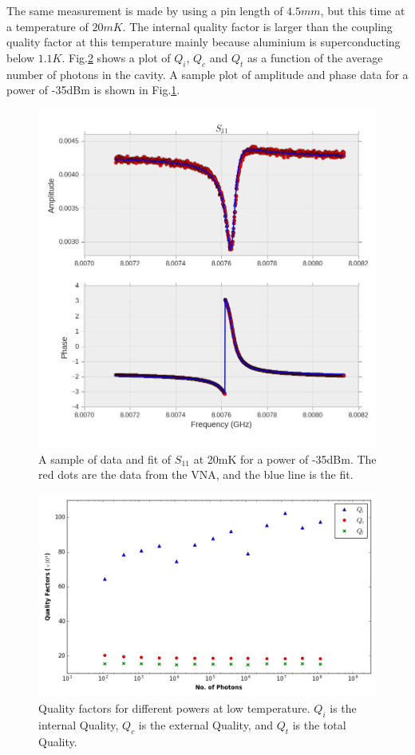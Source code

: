The same measurement is made by using a pin length of $4.5 mm$, but this time at a temperature of $20mK$. The internal quality factor is larger than the coupling quality factor at this temperature mainly because aluminium is superconducting below $1.1K$. Fig.\ref{fig:cold qualities} shows a plot of $Q_i$, $Q_c$ and $Q_t$ as a function of the average number of photons in the cavity. A sample plot of amplitude and phase data for a power of -35dBm is shown in Fig.\ref{fig:fit}.

\begin{figure}
\centering
\includegraphics[width=\linewidth]{Figures/s11fit.png}
\decoRule
\caption[Sample $S_{11}$ fit]{A sample of data and fit of $S_{11}$ at 20mK for a power of -35dBm. The red dots are the data from the VNA, and the blue line is the fit.}
\label{fig:fit}
\end{figure}

\begin{figure}
\centering
\includegraphics[width=\linewidth]{Figures/cold_qualities.png}
\decoRule
\caption[Quality Factors for different powers at low temperature]{Quality factors for different powers at low temperature. $Q_i$ is the internal Quality, $Q_c$ is the external Quality, and $Q_t$ is the total Quality.}
\label{fig:cold qualities}
\end{figure}


